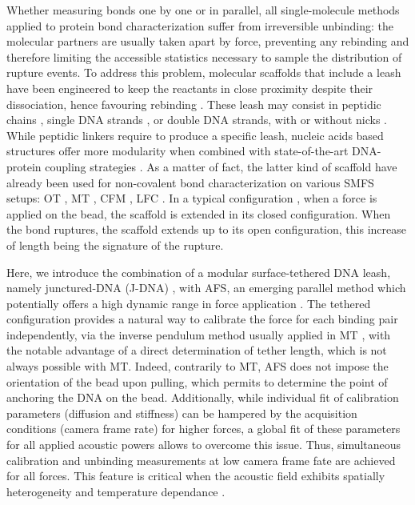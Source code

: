 \documentclass{biophys-new}
\begin{document}
Whether measuring bonds one by one or in parallel, all single-molecule methods applied to protein bond characterization suffer from irreversible unbinding: the molecular partners are usually taken apart by force, preventing any rebinding and therefore limiting the accessible statistics necessary to sample the distribution of rupture events. To address this problem, molecular scaffolds that include a leash have been engineered to keep the reactants in close proximity despite their dissociation, hence favouring rebinding \cite{kim2010, halvorsen2010, gosse2019}. These leash may consist in peptidic chains \cite{kim2010, gao2012, rognoni2012, wang2019, bauer2022}, single DNA strands \cite{mickolajczyk2022, shrestha2021, kilchherr2016}, or double DNA strands, with \cite{yang2016, halvorsen2011, penth2021} or without nicks \cite{li2019, kostrz2019, ma2019}. While peptidic linkers require to produce a specific leash, nucleic acids based structures offer more modularity when combined with state-of-the-art DNA-protein coupling strategies \cite{gosse2019, kostrz2019, maciuba2021, mukhortava2016, synakewicz2019, vandersleen2021, koussa2014, madsen2019}. As a matter of fact, the latter kind of scaffold have already been used for non-covalent bond characterization on various SMFS setups: OT \cite{mickolajczyk2022, kilchherr2016, shrestha2021,yang2016,halvorsen2010}, MT \cite{kostrz2019, shrestha2021, li2019,ma2019}, CFM \cite{yang2016}, LFC \cite{penth2021}. In a typical configuration \cite{kostrz2019}, when a force is applied on the bead, the scaffold is extended in its closed configuration. When the bond ruptures, the scaffold extends up to its open configuration, this increase of length being the signature of the rupture.

Here, we introduce the combination of a modular surface-tethered DNA leash, namely junctured-DNA (J-DNA) \cite{kostrz2019}, with AFS, an emerging parallel method which potentially offers a high dynamic range in force application \cite{sitters2015, kamsma2016}. The tethered configuration provides a natural way to calibrate the force for each binding pair independently, via the inverse pendulum method usually applied in MT \cite{strick1996,gosse2002}, with the notable advantage of a direct determination of tether length, which is not always possible with MT. Indeed, contrarily to MT, AFS does not impose the orientation of the bead upon pulling, which permits to determine the point of anchoring the DNA on the bead. Additionally, while individual fit of calibration parameters (diffusion and stiffness) can be hampered by the acquisition conditions (camera frame rate) for higher forces, a global fit of these parameters for all applied acoustic powers allows to overcome this issue. Thus, simultaneous calibration and unbinding measurements at low camera frame fate are achieved for all forces. This feature is critical when the acoustic field exhibits spatially heterogeneity and temperature dependance \cite{kamsma2016, nguyen2021}. %
\end{document}
